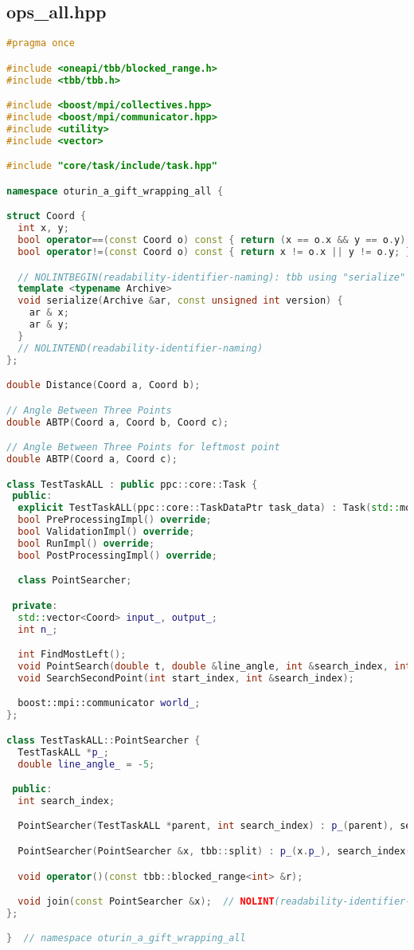 \documentclass[12pt,a4paper]{extarticle}
\begin{document}
\subsection{ops\_all.hpp}
\label{sec:all.hpp}
\begin{lstlisting}[language=C++]
#pragma once

#include <oneapi/tbb/blocked_range.h>
#include <tbb/tbb.h>

#include <boost/mpi/collectives.hpp>
#include <boost/mpi/communicator.hpp>
#include <utility>
#include <vector>

#include "core/task/include/task.hpp"

namespace oturin_a_gift_wrapping_all {

struct Coord {
  int x, y;
  bool operator==(const Coord o) const { return (x == o.x && y == o.y); }
  bool operator!=(const Coord o) const { return x != o.x || y != o.y; }

  // NOLINTBEGIN(readability-identifier-naming): tbb using "serialize"
  template <typename Archive>
  void serialize(Archive &ar, const unsigned int version) {
    ar & x;
    ar & y;
  }
  // NOLINTEND(readability-identifier-naming)
};

double Distance(Coord a, Coord b);

// Angle Between Three Points
double ABTP(Coord a, Coord b, Coord c);

// Angle Between Three Points for leftmost point
double ABTP(Coord a, Coord c);

class TestTaskALL : public ppc::core::Task {
 public:
  explicit TestTaskALL(ppc::core::TaskDataPtr task_data) : Task(std::move(task_data)) {}
  bool PreProcessingImpl() override;
  bool ValidationImpl() override;
  bool RunImpl() override;
  bool PostProcessingImpl() override;

  class PointSearcher;

 private:
  std::vector<Coord> input_, output_;
  int n_;

  int FindMostLeft();
  void PointSearch(double t, double &line_angle, int &search_index, int i);
  void SearchSecondPoint(int start_index, int &search_index);

  boost::mpi::communicator world_;
};

class TestTaskALL::PointSearcher {
  TestTaskALL *p_;
  double line_angle_ = -5;

 public:
  int search_index;

  PointSearcher(TestTaskALL *parent, int search_index) : p_(parent), search_index(search_index) {}

  PointSearcher(PointSearcher &x, tbb::split) : p_(x.p_), search_index(x.search_index) {}

  void operator()(const tbb::blocked_range<int> &r);

  void join(const PointSearcher &x);  // NOLINT(readability-identifier-naming): tbb using this name
};

}  // namespace oturin_a_gift_wrapping_all
\end{lstlisting}
\end{document}
